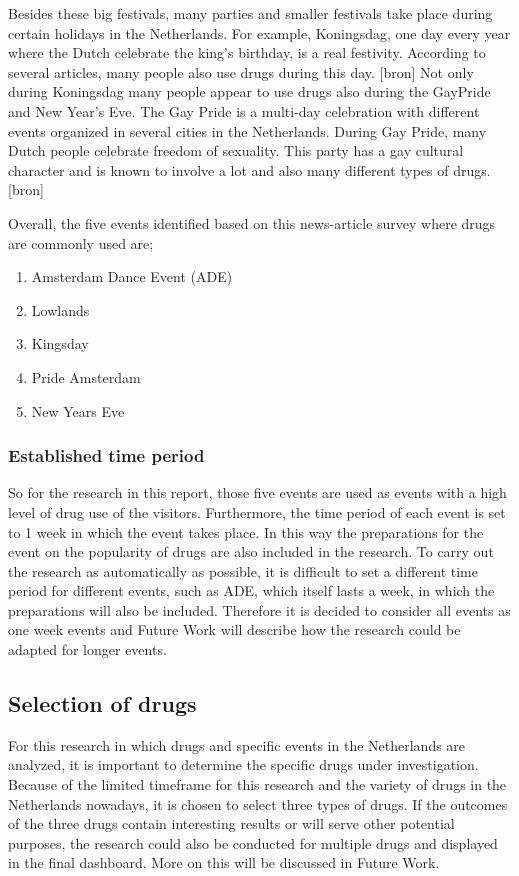Besides these big festivals, many parties and smaller festivals take place during certain holidays in the Netherlands. For example, Koningsdag, one day every year where the Dutch celebrate the king's birthday, is a real festivity. According to several articles, many people also use drugs during this day. [bron]  Not only during Koningsdag many people appear to use drugs also during the GayPride and New Year's Eve. The Gay Pride is a multi-day celebration with different events organized in several cities in the Netherlands. During Gay Pride, many Dutch people celebrate freedom of sexuality. This party has a gay cultural character and is known to involve a lot and also many different types of drugs. [bron]

Overall, the five events identified based on this news-article survey where drugs are commonly used are;

\begin{enumerate}
  \item Amsterdam Dance Event (ADE)
  \item Lowlands
  \item Kingsday
  \item Pride Amsterdam
  \item New Years Eve
\end{enumerate}

\subsubsection{Established time period}

So for the research in this report, those five events are used as events with a high level of drug use of the visitors. Furthermore, the time period of each event is set to 1 week in which the event takes place. In this way the preparations for the event on the popularity of drugs are also included in the research. To carry out the research as automatically as possible, it is difficult to set a different time period for different events, such as ADE, which itself lasts a week, in which the preparations will also be included. Therefore it is decided to consider all events as one week events and Future Work will describe how the research could be adapted for longer events. 

\subsection{Selection of drugs}

For this research in which drugs and specific events in the Netherlands are analyzed, it is important to determine the specific drugs under investigation. Because of the limited timeframe for this research and the variety of drugs in the Netherlands nowadays, it is chosen to select three types of drugs. If the outcomes of the three drugs contain interesting results or will serve other potential purposes, the research could also be conducted for multiple drugs and displayed in the final dashboard. More on this will be discussed in Future Work.


